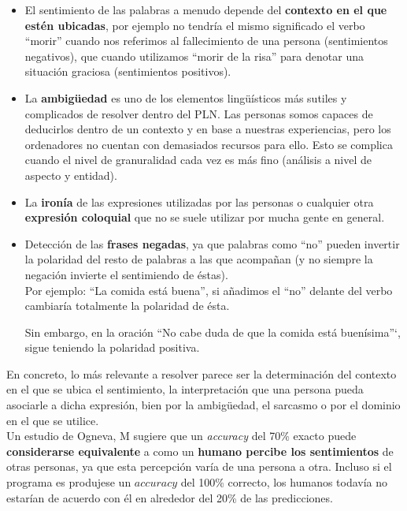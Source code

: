 \documentclass[a4paper,12pt]{report}
\begin{document}
\begin{itemize}
\item El sentimiento de las palabras a menudo depende del \textbf{contexto en el que estén ubicadas}, por ejemplo no tendría el mismo significado el verbo ``morir'' cuando nos referimos al fallecimiento de una persona (sentimientos negativos), que cuando utilizamos ``morir de la risa'' para denotar una situación graciosa (sentimientos positivos).

\item La \textbf{ambigüedad} es uno de los elementos lingüísticos más sutiles y complicados de resolver dentro del PLN. Las personas somos capaces de deducirlos dentro de un contexto y en base a nuestras experiencias, pero los ordenadores no cuentan con demasiados recursos para ello. Esto se complica cuando el nivel de granuralidad cada vez es más fino (análisis a nivel de aspecto y entidad).

\item  La \textbf{ironía} de las expresiones utilizadas por las personas o cualquier otra \textbf{expresión coloquial} que no se suele utilizar por mucha gente en general. 

\item Detección de las \textbf{frases negadas}, ya que palabras como ``no'' pueden invertir la polaridad del resto de palabras a las que acompañan (y no siempre la negación invierte el sentimiendo de éstas). 
\vspace{2mm}\\
Por ejemplo: ``La comida está buena'', si añadimos el ``no'' delante del verbo cambiaría totalmente la polaridad de ésta. 

Sin embargo, en la oración ``No cabe duda de que la comida está buenísima''`, sigue teniendo la polaridad positiva.

\end{itemize}

{\setlength{\parindent}{0cm}
En concreto, lo más relevante a resolver parece ser la determinación del contexto en el que se ubica el sentimiento, la interpretación que una persona pueda asociarle a dicha expresión, bien por la ambigüedad, el sarcasmo o por el dominio en el que se utilice.}
\vspace{2mm}\\
{\setlength{\parindent}{0cm}
Un estudio de Ogneva, M \cite{OGNEVA} sugiere que un \textit{accuracy} del 70\% exacto puede \textbf{considerarse equivalente} a como un \textbf{humano percibe los sentimientos} de otras personas, ya que esta percepción varía de una persona a otra. Incluso si el programa es produjese un $accuracy$ del 100\% correcto, los humanos
todavía no estarían de acuerdo con él en alrededor del 20\% de las predicciones.}
\end{document}
